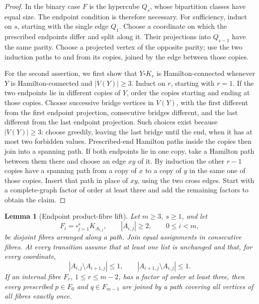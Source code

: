 \documentclass[11pt]{article}
\newtheorem{lemma}[theorem]{Lemma}
\theoremstyle{remark}
\numberwithin{equation}{section}
\begin{document}
\begin{proof}
In the binary case $F$ is the hypercube $Q_s$, whose bipartition
classes have equal size.  The endpoint condition is therefore necessary.
For sufficiency, induct on $s$, starting with the single edge $Q_1$.
Choose a coordinate on which the prescribed endpoints differ and split
along it.  Their projections into $Q_{s-1}$ have the same parity.  Choose
a projected vertex of the opposite parity; use the two induction paths
to and from its copies, joined by the edge between those copies.

For the second assertion, we first show that $Y\square K_r$ is
Hamilton-connected whenever $Y$ is Hamilton-connected and
$|V(Y)|\ge3$.  Induct on $r$, starting with $r=1$.  If the two
endpoints lie in different copies of $Y$, order the copies starting and
ending at those copies.  Choose successive bridge vertices in $V(Y)$,
with the first different from the first endpoint projection, consecutive
bridges different, and the last different from the last endpoint
projection.  Such choices exist because $|V(Y)|\ge3$: choose greedily,
leaving the last bridge until the end, when it has at most two forbidden
values.  Prescribed-end Hamilton paths inside the copies then join into
a spanning path.  If both endpoints lie in one copy, take a Hamilton
path between them there and choose an edge $xy$ of it.  By induction the
other $r-1$ copies have a spanning path from a copy of $x$ to a copy of
$y$ in the same one of those copies.  Insert that path in place of
$xy$, using the two cross edges.  Start with a complete-graph factor of
order at least three and add the remaining factors to obtain the claim.
\end{proof}

\begin{lemma}[Endpoint product-fibre lift]
\label{lem:path-fibre}
Let $m\ge3$, $s\ge1$, and let
\[
 F_i=\square_{j=1}^s K_{A_{i,j}},\qquad |A_{i,j}|\ge2,
 \qquad 0\le i<m,
\]
be disjoint fibres arranged along a path.  Join equal assignments in
consecutive fibres.  At every transition assume that at least one list
is unchanged and that, for every coordinate,
\[
 |A_{i,j}\setminus A_{i+1,j}|\le1,
 \qquad |A_{i+1,j}\setminus A_{i,j}|\le1.
\]
If an internal fibre $F_r$, $1\le r\le m-2$, has a factor of order
at least three, then every prescribed $p\in F_0$ and $q\in F_{m-1}$
are joined by a path covering all vertices of all fibres exactly once.
\end{lemma}
\end{document}
